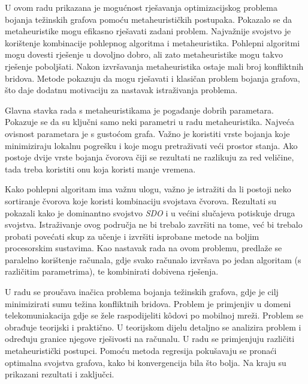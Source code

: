 \documentclass[times, utf8, diplomski, numeric]{fer}
\begin{document}
U ovom radu prikazana je mogućnost rješavanja optimizacijskog problema bojanja težinskih grafova pomoću metaheurističkih postupaka. Pokazalo se da metaheuristike mogu efikasno rješavati zadani problem. Najvažnije svojstvo je korištenje kombinacije pohlepnog algoritma i metaheuristika. Pohlepni algoritmi mogu dovesti rješenje u dovoljno dobro, ali zato metaheuristike mogu takvo rješenje poboljšati. Nakon izvršavanja metaheuristika ostaje mali broj konfliktnih bridova. Metode pokazuju da mogu rješavati i klasičan problem bojanja grafova, što daje dodatnu motivaciju za nastavak istraživanja problema.

Glavna stavka rada s metaheuristikama je pogađanje dobrih parametara. Pokazuje se da su ključni samo neki parametri u radu metaheuristika. Najveća ovisnost parametara je s gustoćom grafa. Važno je koristiti vrste bojanja koje minimiziraju lokalnu pogrešku i koje mogu pretraživati veći prostor stanja. Ako postoje dvije vrste bojanja čvorova čiji se rezultati ne razlikuju za red veličine, tada treba koristiti onu koja koristi manje vremena.

Kako pohlepni algoritam ima važnu ulogu, važno je istražiti da li postoji neko sortiranje čvorova koje koristi kombinaciju svojstava čvorova. Rezultati su pokazali kako je dominantno svojstvo \emph{SDO} i u većini slučajeva potiskuje druga svojstva. Istraživanje ovog područja ne bi trebalo završiti na tome, već bi trebalo probati povećati skup za učenje i izvršiti isprobane metode na boljim procesorskim sustavima. Kao nastavak rada na ovom problemu, predlaže se paralelno korištenje računala, gdje svako računalo izvršava po jedan algoritam (s različitim parametrima), te kombinirati dobivena rješenja. 




\begin{sazetak}

U radu se proučava inačica problema bojanja težinskih grafova, gdje je cilj minimizirati sumu težina konfliktnih bridova. Problem je primjenjiv u domeni telekomuniakacija gdje se žele raspodijeliti k\^{o}dovi po mobilnoj mreži. Problem se obrađuje teorijski i praktično. U teorijskom dijelu detaljno se analizira problem i određuju granice njegove rješivosti na računalu. U radu se primjenjuju različiti metaheuristički postupci. Pomoću metoda regresija pokušavaju se pronaći optimalna svojstva grafova, kako bi konvergencija bila što bolja. Na kraju su prikazani rezultati i zaključci.

\end{sazetak}
\end{document}
